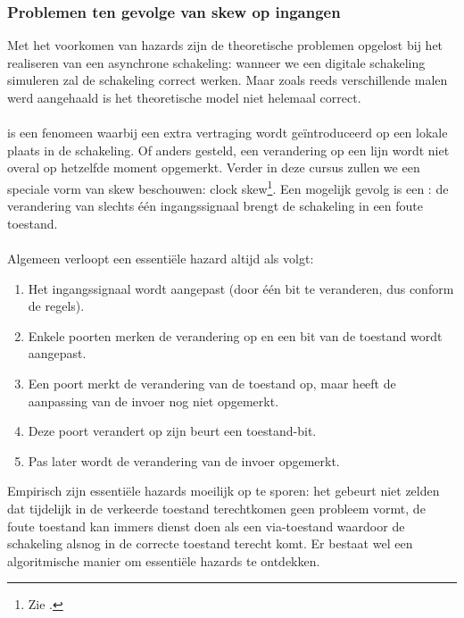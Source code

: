 \subsubsection{Problemen ten gevolge van skew op ingangen}
Met het voorkomen van hazards zijn de theoretische problemen opgelost bij het realiseren van een asynchrone schakeling: wanneer we een digitale schakeling simuleren zal de schakeling correct werken. Maar zoals reeds verschillende malen werd aangehaald is het theoretische model niet helemaal correct.
\paragraph{} is een fenomeen waarbij een extra vertraging wordt ge\"introduceerd op een lokale plaats in de schakeling. Of anders gesteld, een verandering op een lijn wordt niet overal op hetzelfde moment opgemerkt. Verder in deze cursus zullen we een speciale vorm van skew beschouwen: clock skew\footnote{Zie .}. Een mogelijk gevolg is een : de verandering van slechts \'e\'en ingangssignaal brengt de schakeling in een foute toestand.
\paragraph{}
Algemeen verloopt een essenti\"ele hazard altijd als volgt:
\begin{enumerate}
 \item Het ingangssignaal wordt aangepast (door \'e\'en bit te veranderen, dus conform de regels).
 \item Enkele poorten merken de verandering op en een bit van de toestand wordt aangepast.
 \item Een poort merkt de verandering van de toestand op, maar heeft de aanpassing van de invoer nog niet opgemerkt.
 \item Deze poort verandert op zijn beurt een toestand-bit.
 \item Pas later wordt de verandering van de invoer opgemerkt.
\end{enumerate}
Empirisch zijn essenti\"ele hazards moeilijk op te sporen: het gebeurt niet zelden dat tijdelijk in de verkeerde toestand terechtkomen geen probleem vormt, de foute toestand kan immers dienst doen als een via-toestand waardoor de schakeling alsnog in de correcte toestand terecht komt. Er bestaat wel een algoritmische manier om essenti\"ele hazards te ontdekken.
